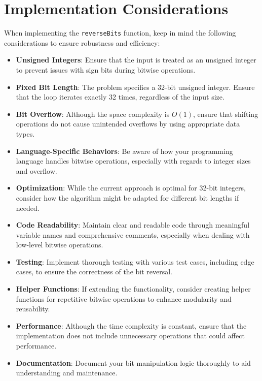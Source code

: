\section*{Implementation Considerations}

When implementing the \texttt{reverseBits} function, keep in mind the following considerations to ensure robustness and efficiency:

\begin{itemize}
    \item \textbf{Unsigned Integers}: Ensure that the input is treated as an unsigned integer to prevent issues with sign bits during bitwise operations.
    
    \item \textbf{Fixed Bit Length}: The problem specifies a 32-bit unsigned integer. Ensure that the loop iterates exactly 32 times, regardless of the input size.
    
    \item \textbf{Bit Overflow}: Although the space complexity is \(O(1)\), ensure that shifting operations do not cause unintended overflows by using appropriate data types.
    
    \item \textbf{Language-Specific Behaviors}: Be aware of how your programming language handles bitwise operations, especially with regards to integer sizes and overflow.
    
    \item \textbf{Optimization}: While the current approach is optimal for 32-bit integers, consider how the algorithm might be adapted for different bit lengths if needed.
    
    \item \textbf{Code Readability}: Maintain clear and readable code through meaningful variable names and comprehensive comments, especially when dealing with low-level bitwise operations.
    
    \item \textbf{Testing}: Implement thorough testing with various test cases, including edge cases, to ensure the correctness of the bit reversal.
    
    \item \textbf{Helper Functions}: If extending the functionality, consider creating helper functions for repetitive bitwise operations to enhance modularity and reusability.
    
    \item \textbf{Performance}: Although the time complexity is constant, ensure that the implementation does not include unnecessary operations that could affect performance.
    
    \item \textbf{Documentation}: Document your bit manipulation logic thoroughly to aid understanding and maintenance.
\end{itemize}

